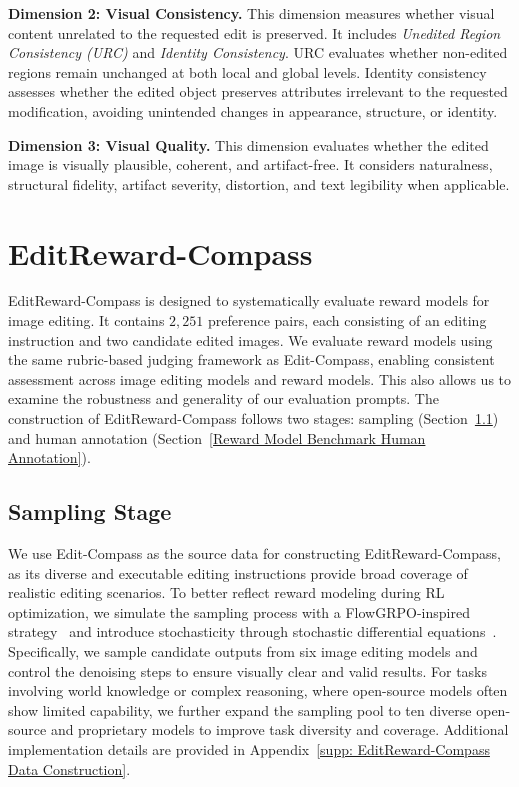 \documentclass{llmxive}
\providecommand{\bench}{Edit-Compass}
\providecommand{\rmbench}{EditReward-Compass}
\begin{document}
\textbf{Dimension 2: Visual Consistency.}
This dimension measures whether visual content unrelated to the requested edit is preserved. It includes \textit{Unedited Region Consistency (URC)} and \textit{Identity Consistency}. URC evaluates whether non-edited regions remain unchanged at both local and global levels. Identity consistency assesses whether the edited object preserves attributes irrelevant to the requested modification, avoiding unintended changes in appearance, structure, or identity.

\textbf{Dimension 3: Visual Quality.}
This dimension evaluates whether the edited image is visually plausible, coherent, and artifact-free. It considers naturalness, structural fidelity, artifact severity, distortion, and text legibility when applicable.




\section{\rmbench}
{\rmbench} is designed to systematically evaluate reward models for image editing. It contains $2,251$ preference pairs, each consisting of an editing instruction and two candidate edited images. We evaluate reward models using the same rubric-based judging framework as {\bench}, enabling consistent assessment across image editing models and reward models. This also allows us to examine the robustness and generality of our evaluation prompts. The construction of {\rmbench} follows two stages: sampling (Section~\ref{Sampling Stage}) and human annotation (Section~\ref{Reward Model Benchmark Human Annotation}).



\subsection{Sampling Stage}
\label{Sampling Stage}
We use {\bench} as the source data for constructing {\rmbench}, as its diverse and executable editing instructions provide broad coverage of realistic editing scenarios. To better reflect reward modeling during RL optimization, we simulate the sampling process with a FlowGRPO-inspired strategy~\cite{liu2025flow} and introduce stochasticity through stochastic differential equations~\cite{song2020score}.
Specifically, we sample candidate outputs from six image editing models and control the denoising steps to ensure visually clear and valid results. For tasks involving world knowledge or complex reasoning, where open-source models often show limited capability, we further expand the sampling pool to ten diverse open-source and proprietary models to improve task diversity and coverage. Additional implementation details are provided in Appendix~\ref{supp: EditReward-Compass Data Construction}.
\end{document}
